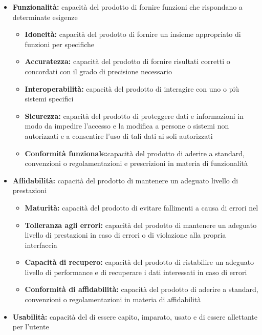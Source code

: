 \documentclass[12pt,a4paper]{article}
\begin{document}
\begin{itemize}
	\item \textbf{Funzionalità: }capacità del prodotto   di fornire funzioni che rispondano a determinate esigenze
	\begin{itemize}
		\item \textbf{Idoneità: }capacità del prodotto   di fornire un insieme appropriato di funzioni per  specifiche
		\item \textbf{Accuratezza:} capacità del prodotto   di fornire risultati corretti o concordati con il grado di precisione necessario
		\item \textbf{Interoperabilità: }capacità del prodotto   di interagire con uno o	più sistemi specifici
		\item \textbf{Sicurezza:} capacità del prodotto   di proteggere dati e informazioni in modo da impedire l'accesso e la modifica a persone o sistemi non autorizzati e a consentire l'uso di tali dati ai soli autorizzati
		\item \textbf{Conformità funzionale:}capacità del prodotto   di aderire a standard, convenzioni o regolamentazioni e prescrizioni in materia di funzionalità
	\end{itemize}
	\item \textbf{Affidabilità:} capacità del prodotto   di mantenere un adeguato livello di prestazioni
	\begin{itemize}
		\item \textbf{Maturità:} capacità del prodotto   di evitare fallimenti a causa di errori nel  
		\item \textbf{Tolleranza agli errori: }capacità del prodotto   di mantenere un adeguato livello di prestazioni in caso di errori   o di violazione alla propria interfaccia
		\item \textbf{Capacità di recupero:} capacità del prodotto   di ristabilire un adeguato livello di performance e di recuperare i dati interessati in caso di errori
		\item \textbf{Conformità di affidabilità:} capacità del prodotto   di aderire a standard, convenzioni o regolamentazioni in materia di affidabilità
	\end{itemize}
	\item \textbf{Usabilità:} capacità del   di essere capito, imparato, usato e di essere allettante per l'utente

\end{itemize}
\end{document}
